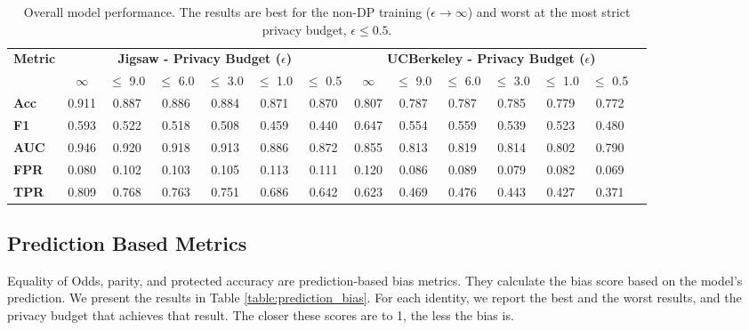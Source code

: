 \documentclass[11pt]{article} %
\begin{document}
\begin{table}[!htb]
\centering
\begin{adjustbox}{max width=0.9\textwidth}
\begin{tabular}{@{}lcccccc|ccccccc@{}}
\toprule
\multirow{2}{*}{\textbf{Metric }} & \multicolumn{6}{c}{\textbf{Jigsaw - Privacy Budget ($\epsilon$)}} & \multicolumn{6}{c}{\textbf{UCBerkeley - Privacy Budget ($\epsilon$)}} \\
 & $\infty$ & $\le$ 9.0 & $\le$ 6.0 & $\le$ 3.0 & $\le$ 1.0 & $\le$ 0.5 & $\infty$  & $\le$ 9.0 & $\le$ 6.0 & $\le$ 3.0 & $\le$ 1.0 & $\le$ 0.5 \\ \midrule
\textbf{Acc} & 0.911	& 0.887	& 0.886	 & 0.884 & 0.871	 & 0.870  & 0.807	& 0.787		& 0.787	 & 0.785 & 0.779	 & 0.772 	 \\ 
\textbf{F1} & 0.593 & 0.522& 0.518 & 0.508 & 0.459	 & 0.440 	& 0.647 & 0.554	& 0.559	 & 0.539 & 0.523 &  0.480  \\ 
\textbf{AUC} & 0.946& 0.920	& 0.918 & 0.913	 &  0.886 &0.872   & 0.855& 0.813	& 0.819 & 0.814	 &  0.802 &   0.790	 \\ 
\textbf{FPR} & 0.080 & 0.102 & 0.103 & 0.105 &   0.113 &  0.111  & 0.120  & 0.086	& 0.089 & 0.079	 &  0.082 & 0.069 \\ 
\textbf{TPR} & 0.809 & 0.768 & 0.763 & 0.751 &  0.686 & 0.642  & 0.623 & 0.469	& 0.476 & 0.443	 &  0.427 &  0.371\\ 

 \bottomrule
\end{tabular}
\end{adjustbox}
\caption{Overall model performance. The results are best for the non-DP training ($\epsilon \to \infty$) and worst at the most strict privacy budget, $\epsilon \le 0.5$. }
\label{table:overall}
\end{table}


\subsection{Prediction Based Metrics \label{sec:prediction_based_bias}}

Equality of Odds, parity, and protected accuracy are prediction-based bias metrics. They calculate the bias score based on the model's prediction. We present the results in Table \ref{table:prediction_bias}. For each identity, we report the best and the worst results, and the privacy budget that achieves that result. The closer these scores are to 1, the less the bias is.
\end{document}

